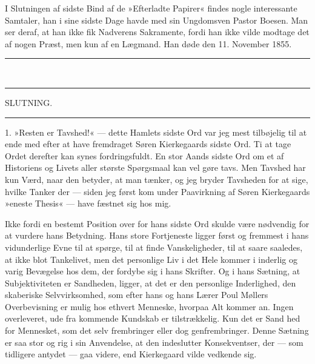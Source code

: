 \documentclass[12pt,a4paper,openany]{book}
\newcommand{\opage}[1]{\marginnote{\footnotesize\textit{[#1]}}}
\begin{document}
I Slutningen af sidste Bind af de »Efterladte Papirer«
findes nogle interessante Samtaler, han i sine sidste Dage
havde med sin Ungdomsven Pastor Boesen. Man ser
deraf, at han ikke fik Nadverens Sakramente, fordi han
ikke vilde modtage det af nogen Præst, men kun af en
Lægmand. Han døde den 11. November 1855.
\begin{center}\rule{2cm}{0.4pt}\\[-8pt]\rule{2cm}{0.4pt}\end{center}

\opage{150}\begin{center}SLUTNING.\\[4pt]\rule{1.5cm}{0.4pt}\end{center}

1. »Resten er Tavshed!« --- dette Hamlets sidste
Ord var jeg mest tilbøjelig til at ende med efter at have
fremdraget Søren Kierkegaards sidste Ord. Ti at tage
Ordet derefter kan synes fordringsfuldt. En stor Aands
sidste Ord om et af Historiens og Livets aller største
Spørgsmaal kan vel gøre tavs. Men Tavshed har kun
Værd, naar den betyder, at man tænker, og jeg bryder
Tavsheden for at sige, hvilke Tanker der --- siden jeg først
kom under Paavirkning af Søren Kierkegaards »eneste
Thesis« --- have fæstnet sig hos mig.

Ikke fordi en bestemt Position over for hans sidste
Ord skulde være nødvendig for at vurdere hans Betydning.
Hans store Fortjeneste ligger først og fremmest i
hans vidunderlige Evne til at spørge, til at finde Vanskeligheder,
til at saare saaledes, at ikke blot Tankelivet,
men det personlige Liv i det Hele kommer i inderlig og
varig Bevægelse hos dem, der fordybe sig i hans Skrifter.
Og i hans Sætning, at Subjektiviteten er Sandheden,
ligger, at det er den personlige Inderlighed, den skaberiske
Selvvirksomhed, som efter hans og hans Lærer Poul
Møllers Overbevisning er mulig hos ethvert Menneske,
hvorpaa Alt kommer an. Ingen overleveret, ude fra
kommende Kundskab er tilstrækkelig. Kun det er Sand%
\opage{151}hed for Mennesket, som det selv frembringer eller dog
genfrembringer. Denne Sætning er saa stor og rig i sin
Anvendelse, at den indeslutter Konsekventser, der ---
som tidligere antydet --- gaa videre, end Kierkegaard
vilde vedkende sig.
\end{document}
